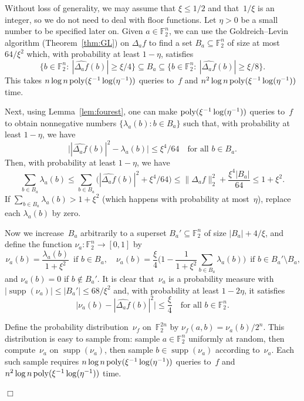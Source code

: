 \documentclass[11pt]{amsart}
\newcommand{\F}{\mathbb{F}} %
\DeclareMathOperator{\supp}{supp}
\newcommand{\poly}{\mbox{\rm poly}}
\theoremstyle{plain}
\theoremstyle{definition}
\theoremstyle{remark}
\renewenvironment{proof}[1][]{
    	\begin{trivlist}
     	\item[\hspace{\labelsep}{\em\noindent Proof#1:\/}]}
     	{{\hfill$\Box$}
    	\end{trivlist}
  }
\begin{document}
\begin{proof}[ of Lemma~\ref{lem:sampling}]
Without loss of generality, we may assume that $\xi \leq 1/2$ and that~$1/\xi$ is an integer, so we do not need to deal with floor functions.
Let $\eta>0$ be a small number to be specified later on.
Given $a\in \F_2^n$, we can use the Goldreich--Levin algorithm (Theorem~\ref{thm:GL}) on $\Delta_a f$ to find a set $B_a \subseteq \F_2^n$ of size at most $64/\xi^2$ which, with probability at least $1-\eta$, satisfies
\begin{equation*}
    \big\{b\in \F_2^n:\: |\widehat{\Delta_a f}(b)| \geq \xi/4\big\} \subseteq B_a \subseteq \big\{b\in \F_2^n:\: |\widehat{\Delta_a f}(b)| \geq \xi/8\big\}.
\end{equation*}
This takes $n \log n\, \poly(\xi^{-1} \log(\eta^{-1}))$ queries to~$f$ and $n^2 \log n\, \poly(\xi^{-1} \log(\eta^{-1}))$ time.

Next, using  Lemma~\ref{lem:fourest}, one can make $\poly(\xi^{-1} \log(\eta^{-1}))$ queries to~$f$ to obtain nonnegative numbers $\{\lambda_a(b): b\in B_a\}$ such that, with probability at least $1-\eta$, we have
$$\big||\widehat{\Delta_a f}(b)|^2 - \lambda_a(b)\big| \leq \xi^4/64 \quad \text{for all $b\in B_a$}.$$
Then, with probability at least $1-\eta$, we have
\begin{equation*}
    \sum_{b\in B_a} \lambda_a(b) \leq \sum_{b\in B_a} \big(|\widehat{\Delta_a f}(b)|^2 + \xi^4/64\big) \leq \|\Delta_a f\|_2^2 + \frac{\xi^4 |B_a|}{64} \leq 1 + \xi^2.
\end{equation*}
If $\sum_{b\in B_a} \lambda_a(b) > 1+\xi^2$ (which happens with probability at most~$\eta$), replace each $\lambda_a(b)$ by zero.

Now we increase~$B_a$ arbitrarily to a superset $B_a' \subseteq \F_2^n$ of size $|B_a| + 4/\xi$, and define the function $\nu_a: \F_2^n \to [0, 1]$ by
$$\nu_a(b) = \frac{\lambda_a(b)}{1+\xi^2}\, \text{ if $b\in B_a$}, \quad \nu_a(b) = \frac{\xi}{4}\Big(1- \frac{1}{1+\xi^2} \sum_{b\in B_a} \lambda_a(b)\Big)\, \text{ if $b\in B_a' \setminus B_a$,}$$
and $\nu_a(b) = 0$ if $b\notin B_a'$.
It is clear that~$\nu_a$ is a probability measure with $|\supp(\nu_a)| \leq |B_a'| \leq 68/\xi^2$ and, with probability at least $1-2\eta$, it satisfies
$$\big|\nu_a(b) - |\widehat{\Delta_a f}(b)|^2\big| \leq \frac{\xi}{4} \quad \text{for all $b\in \F_2^n$.}$$

Define the probability distribution~$\nu_f$ on~$\F_2^{2n}$ by $\nu_f(a, b) = \nu_a(b)/2^n$.
This distribution is easy to sample from:
sample $a\in \F_2^n$ uniformly at random, then compute~$\nu_a$ on $\supp(\nu_a)$, then sample $b\in \supp(\nu_a)$ according to~$\nu_a$.
Each such sample requires $n \log n\, \poly(\xi^{-1} \log(\eta^{-1}))$ queries to~$f$ and $n^2 \log n\, \poly(\xi^{-1} \log(\eta^{-1}))$ time.


\end{proof}
\end{document}
